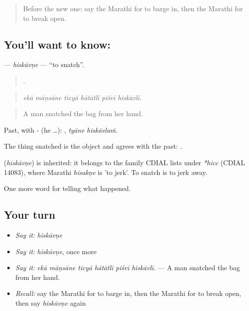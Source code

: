\label{lesson:MR-C297-hiskavne}



\begin{quote}
Before the new one: say the Marathi for to barge in, then the Marathi for to break open.
\end{quote}

\subsection*{You'll want to know: }
\textbf{} — \emph{hiskāvṇe} — \textquotedblleft{}to snatch\textquotedblright{}.

\begin{quote}
     .
\end{quote}

\begin{quote}
\emph{ekā māṇsāne ticyā hātātlī piśvī hiskāvlī.}
\end{quote}

\begin{quote}
A man snatched the bag from her hand.
\end{quote}

Past, with - (he …):  , \emph{tyāne hiskāvlaṁ}.

The thing snatched is the object and agrees with the past:  .

\begin{cousinweb}
\textbf{} (\emph{hiskāvṇe}) is inherited: it belongs to the family CDIAL lists under \emph{*hicc} (CDIAL 14083), where Marathi \emph{hisakṇe} is 'to jerk'. To snatch is to jerk away.
\end{cousinweb}

\begin{grammarlens}[title={What you've built}]
One more word for telling what happened.
\end{grammarlens}

\subsection*{Your turn}
\begin{itemize}
\raggedright
  \item \emph{Say it:} \emph{hiskāvṇe}
  \item \emph{Say it:} \emph{hiskāvṇe}, once more
  \item \emph{Say it:} \emph{ekā māṇsāne ticyā hātātlī piśvī hiskāvlī.} — A man snatched the bag from her hand.
  \item \emph{Recall:} say the Marathi for to barge in, then the Marathi for to break open, then say \emph{hiskāvṇe} again
\end{itemize}

